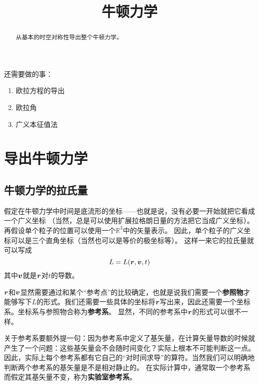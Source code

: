 \documentclass[UTF8, a4paper]{ctexart}
\title{牛顿力学}
\newcommand*{\reals}{\mathbb{R}}
\begin{document}
\maketitle

\begin{abstract}
    从基本的时空对称性导出整个牛顿力学。
\end{abstract}

还需要做的事：
\begin{enumerate}
    \item 欧拉方程的导出
    \item 欧拉角
    \item 广义本征值法
\end{enumerate}

\section{导出牛顿力学}

\subsection{牛顿力学的拉氏量}

假定在牛顿力学中时间是底流形的坐标——也就是说，没有必要一开始就把它看成一个广义坐标
（当然，总是可以使用扩展拉格朗日量的方法把它当成广义坐标）。
再假设单个粒子的位置可以使用一个$\reals^3$中的矢量表示。
因此，单个粒子的广义坐标可以是三个直角坐标（当然也可以是等价的极坐标等）。
这样一来它的拉氏量就可以写成
\[
    L = L(\vb*{r}, \vb*{v}, t)
\]
其中$\vb*{v}$就是$\vb*{r}$对$t$的导数。

$\vb*{r}$和$\vb*{v}$显然需要通过和某个“参考点”的比较确定，也就是说我们需要一个\textbf{参照物}才能够写下$L$的形式。我们还需要一些具体的坐标将$\vb*{r}$写出来，因此还需要一个坐标系。坐标系与参照物合称为\textbf{参考系}。
显然，不同的参考系中$\vb*{r}$的形式可以很不一样。

关于参考系要额外提一句：因为参考系中定义了基矢量，在计算矢量导数的时候就产生了一个问题：这些基矢量会不会随时间变化？实际上根本不可能判断这一点。因此，实际上每个参考系都有它自己的“对时间求导”的算符。当然我们可以明确地判断两个参考系的基矢量是不是相对静止的。
在实际计算中，通常取一个参考系而假定其基矢量不变，称为\textbf{实验室参考系}。
\end{document}
